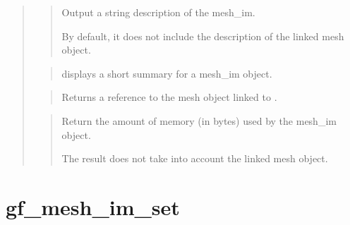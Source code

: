 \documentclass[a4paper,11pt,english]{sphinxmanual}
\begin{document}
\begin{quote}
\begin{quote}

Output a string description of the mesh\_im.

By default, it does not include the description of the linked
mesh object.
\end{quote}

\begin{quote}

displays a short summary for a mesh\_im object.
\end{quote}

\begin{quote}

Returns a reference to the mesh object linked to .
\end{quote}

\begin{quote}

Return the amount of memory (in bytes) used by the mesh\_im object.

The result does not take into account the linked mesh object.
\end{quote}
\end{quote}


\section{gf\_mesh\_im\_set}
\label{\detokenize{matlab_octave/cmdref_gf_mesh_im_set:gf-mesh-im-set}}\label{\detokenize{matlab_octave/cmdref_gf_mesh_im_set::doc}}

\begin{sphinxVerbatim}[commandchars=\\\{\}]
    \PYG{p}{[}  \PYG{p}{]}
  
\end{sphinxVerbatim}
\end{document}
